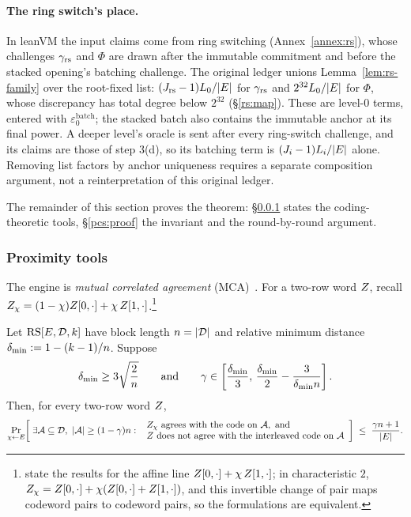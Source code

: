\paragraph{The ring switch's place.} In leanVM the input claims come from ring switching (Annex~\ref{annex:rs}), whose challenges $\gamma_{\mathrm{rs}}$ and $\Phi$ are drawn after the immutable commitment and before the stacked opening's batching challenge. The original ledger unions Lemma~\ref{lem:rs-family} over the root-fixed list: $(J_{\mathrm{rs}}-1)L_0/|E|$ for $\gamma_{\mathrm{rs}}$ and $2^{32}L_0/|E|$ for $\Phi$, whose discrepancy has total degree below $2^{32}$ (\S\ref{rs:map}). These are level-$0$ terms, entered with $\varepsilon^{\mathrm{batch}}_0$; the stacked batch also contains the immutable anchor at its final power. A deeper level's oracle is sent after every ring-switch challenge, and its claims are those of step 3(d), so its batching term is $(J_i-1)L_i/|E|$ alone. Removing list factors by anchor uniqueness requires a separate composition argument, not a reinterpretation of this original ledger.

The remainder of this section proves the theorem: \S\ref{sec:tools} states the coding-theoretic tools, \S\ref{pcs:proof} the invariant and the round-by-round argument.

\subsubsection{Proximity tools}\label{sec:tools}

The engine is \emph{mutual correlated agreement} (MCA)~\cite{ACFY25}. For a two-row word $Z$, recall $Z_\chi = (1-\chi)Z[0,\cdot] + \chi\,Z[1,\cdot]$.\footnote{\cite{BCHKS25} state the results for the affine line $Z[0,\cdot] + \chi\,Z[1,\cdot]$; in characteristic $2$, $Z_\chi = Z[0,\cdot] + \chi(Z[0,\cdot] + Z[1,\cdot])$, and this invertible change of pair maps codeword pairs to codeword pairs, so the formulations are equivalent.}

\begin{theorem}\label{thm:mca-udr}
Let $\mathrm{RS}[E,\mathcal{D},k]$ have block length $n = |\mathcal{D}|$ and relative minimum distance $\delta_{\min} := 1 - (k-1)/n$. Suppose
\[
\delta_{\min} \ge 3\sqrt{\frac{2}{n}}
\qquad\text{and}\qquad
\gamma \in \left[\frac{\delta_{\min}}{3},\,\frac{\delta_{\min}}{2} - \frac{3}{\delta_{\min} n}\right].
\]
Then, for every two-row word $Z$,
\[
\Pr_{\chi \leftarrow E}\!\left[\; \exists \mathcal{A} \subseteq \mathcal{D},\ |\mathcal{A}| \ge (1-\gamma) n :\ \begin{array}{l} Z_\chi \text{ agrees with the code on } \mathcal{A}, \text{ and} \\ Z \text{ does not agree with the interleaved code on } \mathcal{A} \end{array} \right]
\;\le\; \frac{\gamma n + 1}{|E|}.
\]
\end{theorem}

